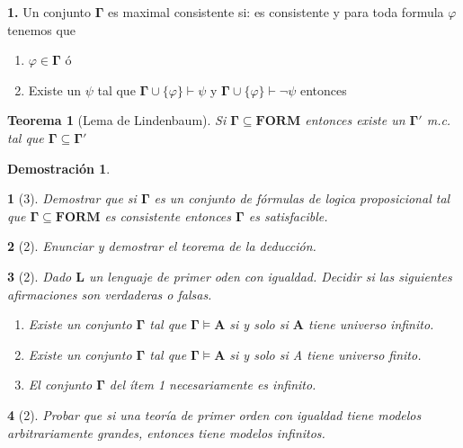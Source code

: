 \documentclass[leqno, 12pt, twoside,letterpaper]{book}
\theoremstyle{plain}
\newtheorem{thm}{Teorema}[chapter]
\newtheorem*{dem}{Demostración}
\newtheorem{ej}{}
\theoremstyle{definition}
\newcommand{\bgamma}[0]{\bm{\Gamma}}
\newcommand{\ba}[0]{\bm{A}}
\newcommand{\FORM}[0]{\bm{FORM}}
\newenvironment{solution}[0]{\begin{adjustwidth}{1.5em}{1.5em}}{\end{adjustwidth}}
\begin{document}
\begin{solution}
\textbf{1.} Un conjunto $\bm{\Gamma}$ es maximal consistente si: es consistente y para toda formula $\varphi$ tenemos que
\begin{enumerate} 
	\item $\varphi \in \bm\Gamma$ ó
	\item Existe un $\psi$ tal que $\bm{\Gamma} \cup \{\varphi\} \vdash \psi$  y $\bm{\Gamma} \cup \{\varphi\} \vdash \lnot\psi$ entonces
\end{enumerate}

\begin{thm}[Lema de Lindenbaum] Si $\bm{\Gamma} \subseteq \FORM$ entonces existe un $\bm{\Gamma'}$ m.c. tal que $\bm{\Gamma} \subseteq \bm{\Gamma'}$
\end{thm}

\begin{dem}

\end{dem}

\end{solution}

\begin{ej}[3]
    Demostrar que si $\bm{\Gamma}$ es un conjunto de fórmulas de logica proposicional
    tal que $\bm{\Gamma \subseteq FORM}$ es consistente entonces $\bm{\Gamma}$ es
    satisfacible.
\end{ej}

\begin{ej}[2]
    Enunciar y demostrar el teorema de la deducción.
\end{ej}

\begin{ej}[2]
    Dado $\bm{L}$ un lenguaje de primer oden con igualdad. Decidir si las
    siguientes afirmaciones son verdaderas o falsas.

    \begin{enumerate}
        \item Existe un conjunto $\bgamma$ tal que $\bgamma \models \ba$ si  y
            solo si $\ba$ tiene universo infinito.
        \item Existe un conjunto $\bgamma$ tal que $\bgamma \models \ba$ si y
            solo si A tiene universo finito.
        \item El conjunto $\bgamma$ del ítem 1 necesariamente es infinito.
    \end{enumerate}

\end{ej}


\begin{ej}[2]
    Probar que si una teoría de primer orden con igualdad tiene modelos
    arbitrariamente grandes, entonces tiene modelos infinitos.
\end{ej}
\end{document}
